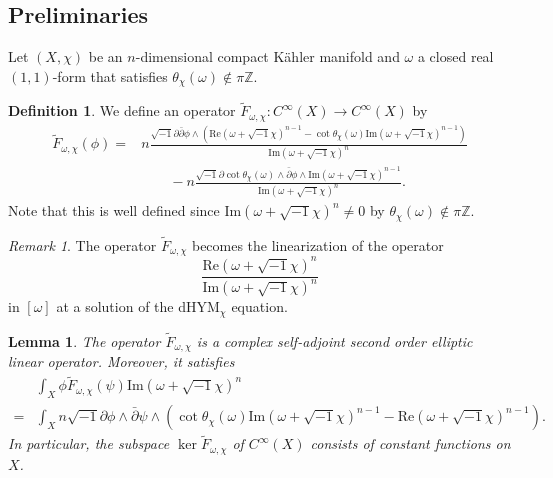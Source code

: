 \documentclass{amsart}
\numberwithin{equation}{section}
\theoremstyle{plain}
\newtheorem{lemma}[equation]{Lemma}
\theoremstyle{definition}
\newtheorem{definition}[equation]{Definition}
\theoremstyle{remark}
\newtheorem{remark}[equation]{Remark}
\begin{document}
\subsection{Preliminaries}\label{sec:dhympre}
Let $(X,\chi)$ be an $n$-dimensional compact K{\"a}hler manifold and $\omega$ a closed real $(1,1)$-form that satisfies $\theta_\chi(\omega)\notin\pi\mathbb{Z}$.
\begin{definition}\label{def:tilF-op}
    We define an operator $\tilde{F}_{\omega,\chi}:C^\infty(X)\to C^\infty(X)$ by
    \begin{align*}
        \tilde{F}_{\omega,\chi}(\phi)=&n\frac{\sqrt{-1}\partial\bar{\partial}\phi\wedge\left(\mathrm{Re}(\omega+\sqrt{-1}\chi)^{n-1}-\cot\theta_\chi(\omega)\mathrm{Im}(\omega+\sqrt{-1}\chi)^{n-1}\right)}{\mathrm{Im}(\omega+\sqrt{-1}\chi)^n}\\&\qquad-n\frac{\sqrt{-1}\partial\cot\theta_\chi(\omega)\wedge\bar{\partial}\phi\wedge\mathrm{Im}(\omega+\sqrt{-1}\chi)^{n-1}}{\mathrm{Im}(\omega+\sqrt{-1}\chi)^n}.
    \end{align*}
    Note that this is well defined since $\mathrm{Im}(\omega+\sqrt{-1}\chi)^n\neq0$ by $\theta_\chi(\omega)\notin\pi\mathbb{Z}$.
\end{definition}

\begin{remark}
    The operator $\tilde{F}_{\omega,\chi}$ becomes the linearization of the operator 
    $$\frac{\mathrm{Re}(\omega+\sqrt{-1}\chi)^{n}}{\mathrm{Im}(\omega+\sqrt{-1}\chi)^{n}}$$
    in $[\omega]$ at a solution of the dHYM$_\chi$ equation.
\end{remark}

\begin{lemma}\label{lem:dhymadjoint}
    The operator $\tilde{F}_{\omega,\chi}$ is a complex self-adjoint second order elliptic linear operator. Moreover, it satisfies
    \begin{align*}
        &\int_X \phi \tilde{F}_{\omega,\chi}(\psi)\mathrm{Im}(\omega+\sqrt{-1}\chi)^{n}\\
        =&\int_X n\sqrt{-1}\partial\phi\wedge \bar{\partial}\psi\wedge \left(\cot{\theta_\chi(\omega)}\mathrm{Im}(\omega+\sqrt{-1}\chi)^{n-1}-\mathrm{Re}(\omega+\sqrt{-1}\chi)^{n-1}\right).
    \end{align*}
    In particular,
    the subspace $\ker \tilde{F}_{\omega,\chi}$ of $C^\infty(X)$ consists of constant functions on $X$. 
\end{lemma}
\end{document}

